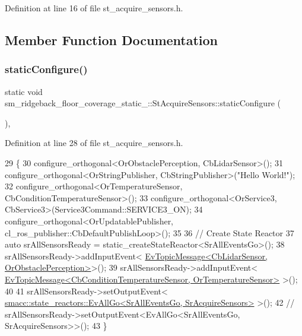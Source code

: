 Definition at line 16 of file st\+\_\+acquire\+\_\+sensors.\+h.



\subsection{Member Function Documentation}
\mbox{\label{structsm__ridgeback__floor__coverage__static__1_1_1StAcquireSensors_a2e318d3806ffa9774a0266a54d5c6266}} 
\subsubsection{\texorpdfstring{static\+Configure()}{staticConfigure()}}
{\footnotesize\ttfamily static void sm\+\_\+ridgeback\+\_\+floor\+\_\+coverage\+\_\+static\+\_\+::\+St\+Acquire\+Sensors\+::static\+Configure (\begin{DoxyParamCaption}{ }\end{DoxyParamCaption})\hspace{0.3cm}{\ttfamily [inline]}, {\ttfamily [static]}}



Definition at line 28 of file st\+\_\+acquire\+\_\+sensors.\+h.


\begin{DoxyCode}
29    \{
30       configure\_orthogonal<OrObstaclePerception, CbLidarSensor>();
31       configure\_orthogonal<OrStringPublisher, CbStringPublisher>(\textcolor{stringliteral}{"Hello World!"});
32       configure\_orthogonal<OrTemperatureSensor, CbConditionTemperatureSensor>();
33       configure\_orthogonal<OrService3, CbService3>(Service3Command::SERVICE3\_ON);
34       configure\_orthogonal<OrUpdatablePublisher, cl\_ros\_publisher::CbDefaultPublishLoop>();
35 
36       \textcolor{comment}{// Create State Reactor}
37       \textcolor{keyword}{auto} srAllSensorsReady = static\_createStateReactor<SrAllEventsGo>();
38       srAllSensorsReady->addInputEvent<
      \hyperlink{structsmacc_1_1default__events_1_1EvTopicMessage}{EvTopicMessage<CbLidarSensor, OrObstaclePerception>}>();
39       srAllSensorsReady->addInputEvent<
      \hyperlink{structsmacc_1_1default__events_1_1EvTopicMessage}{EvTopicMessage<CbConditionTemperatureSensor, OrTemperatureSensor>}
      >();
40 
41       srAllSensorsReady->setOutputEvent<
      \hyperlink{structsmacc_1_1state__reactors_1_1EvAllGo}{smacc::state\_reactors::EvAllGo<SrAllEventsGo, SrAcquireSensors>}
      >();
42       \textcolor{comment}{// srAllSensorsReady->setOutputEvent<EvAllGo<SrAllEventsGo, SrAcquireSensors>>();}
43    \}
\end{DoxyCode}


